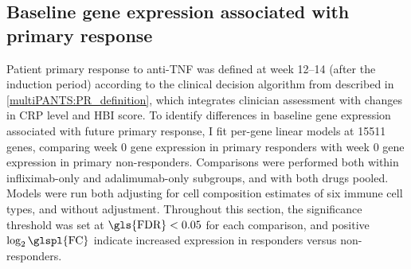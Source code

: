 

\subsection{Baseline gene expression associated with primary response}

Patient primary response to anti-\gls{TNF} was defined at week \numrange{12}{14} (after the induction period) according to the clinical decision algorithm from \textcite{kennedy2019PredictorsAntiTNFTreatment} described in \cref{multiPANTS:PR_definition}, 
which integrates clinician assessment with changes in \gls{CRP} level and \gls{HBI} score.
To identify differences in baseline gene expression associated with future primary response, 
I fit per-gene linear models at \num{15511} genes, comparing week 0 gene expression in primary responders with week 0 gene expression in primary non-responders.
Comparisons were performed both within infliximab-only and adalimumab-only subgroups, and with both drugs pooled.
Models were run both adjusting for cell composition estimates of six immune cell types, and without adjustment.
Throughout this section, the significance threshold was set at $\text{\gls{FDR}} < 0.05$ for each comparison, and positive $\log_2\text{\glspl{FC}}$ indicate increased expression in responders versus non-responders.

